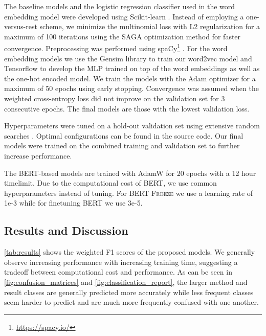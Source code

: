 The baseline models and the logistic regression classifier used in the word embedding model were developed using Scikit-learn \citep{scikit-learn}. Instead of employing a one-versus-rest scheme, we minimize the multinomial loss with L2 regularization for a maximum of 100 iterations using the SAGA optimization method \citep{defazio2014saga} for faster convergence. Preprocessing was performed using spaCy\footnote{\url{https://spacy.io/}} \citep{spacy2020}. For the word embedding models we use the Gensim library \citep{gensim} to train our word2vec model and Tensorflow \citep{tensorflow2015-whitepaper} to develop the MLP trained on top of the word embeddings as well as the one-hot encoded model. We train the models with the Adam optimizer \citep{kingma2014adam} for a maximum of 50 epochs using early stopping. Convergence was assumed when the weighted cross-entropy loss did not improve on the validation set for 3 consecutive epochs. The final models are those with the lowest validation loss. 

Hyperparameters were tuned on a hold-out validation set using extensive random searches \citep{bergstra2012random}. Optimal configurations can be found in the source code. Our final models were trained on the combined training and validation set to further increase performance.

The BERT-based models are trained with AdamW \cite{loshchilov2017decoupled} for 20 epochs with a 12 hour timelimit. Due to the computational cost of BERT, we use common hyperparameters instead of tuning. For \textsc{BERT Freeze} we use a learning rate of 1e-3 while for finetuning BERT we use 3e-5.

\subsection{Results and Discussion}

\autoref{tab:results} shows the weighted F1 scores of the proposed models. We generally observe increasing performance with increasing training time, suggesting a tradeoff between computational cost and performance. As can be seen in \autoref{fig:confusion_matrices} and \autoref{fig:classification_report}, the larger method and result classes are generally predicted more accurately while less frequent classes seem harder to predict and are much more frequently confused with one another.

